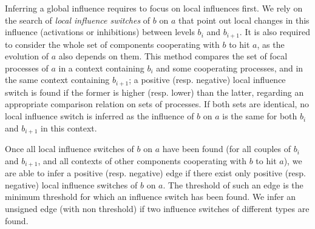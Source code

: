Inferring a global influence requires to focus on local influences first.
We rely on the search of \emph{local influence switches} of $b$ on $a$ that point out local changes in this influence (activations or inhibitions) between levels $b_i$ and $b_{i+1}$.
It is also required to consider the whole set of components cooperating with $b$ to hit $a$, as the evolution of $a$ also depends on them.
This method compares the set of focal processes of $a$ in a context containing $b_i$ and some cooperating processes, and in the same context containing $b_{i+1}$;
a positive (resp. negative) local influence switch is found if the former is higher (resp. lower) than the latter, regarding an appropriate comparison relation on sets of processes.
If both sets are identical, no local influence switch is inferred as the influence of $b$ on $a$ is the same for both $b_i$ and $b_{i+1}$ in this context.

Once all local influence switches of $b$ on $a$ have been found (for all couples of $b_i$ and $b_{i+1}$, and all contexts of other components cooperating with $b$ to hit $a$),
we are able to infer a positive (resp. negative) edge if there exist only positive (resp. negative) local influence switches of $b$ on $a$.
The threshold of such an edge is the minimum threshold for which an influence switch has been found.
We infer an unsigned edge (with non threshold) if two influence switches of different types are found.

\begin{comment}
The inference of the \emph{influence switches}, which point out local changes in the influence (activations or inhibitions) between levels $b_i$ and $b_{i+1}$, requires to consider the whole set of components cooperating with $b$ to hit $a$.
The method relies on the comparison of the focal processes of $a$ in a context containing $b_i$, and in the same context containing $b_{i+1}$.
We are able to infer a positive (resp. negative) edge if there exist corresponding influence switches with the same sign only; the threshold of such an edge is the minimum threshold for which an influence switch has been found.
We infer an unsigned edge (with non threshold) when two influence switches with different signs are found.
\end{comment}

